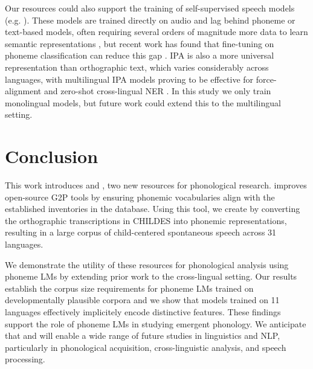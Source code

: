 Our resources could also support the training of self-supervised speech models (e.g. \citet{hsu2021hubert}). These models are trained directly on audio and lag behind phoneme or text-based models, often requiring several orders of magnitude more data to learn semantic representations \citep{cuervo2024scaling}, but recent work has found that fine-tuning on phoneme classification can reduce this gap \citep{feng-2023-language-universal-phonetic, poli2024improving}. IPA is also a more universal representation than orthographic text, which varies considerably across languages, with multilingual IPA models proving to be effective for force-alignment \citep{zhu-etal-2024-taste} and zero-shot cross-lingual NER \citep{sohn2024zero}. In this study we only train monolingual models, but future work could extend this to the multilingual setting.

\section{Conclusion}

This work introduces \gpp and \ipachildes, two new resources for phonological research. \gpp improves open-source G2P tools by ensuring phonemic vocabularies align with the established inventories in the \phoible database. Using this tool, we create \ipachildes by converting the orthographic transcriptions in CHILDES into phonemic representations, resulting in a large corpus of child-centered spontaneous speech across 31 languages.

We demonstrate the utility of these resources for phonological analysis using phoneme LMs by extending prior work to the cross-lingual setting. Our results establish the corpus size requirements for phoneme LMs trained on developmentally plausible corpora and we show that models trained on 11 languages effectively implicitely encode distinctive features. These findings support the role of phoneme LMs in studying emergent phonology. We anticipate that \gpp and \ipachildes will enable a wide range of future studies in linguistics and NLP, particularly in phonological acquisition, cross-linguistic analysis, and speech processing.




